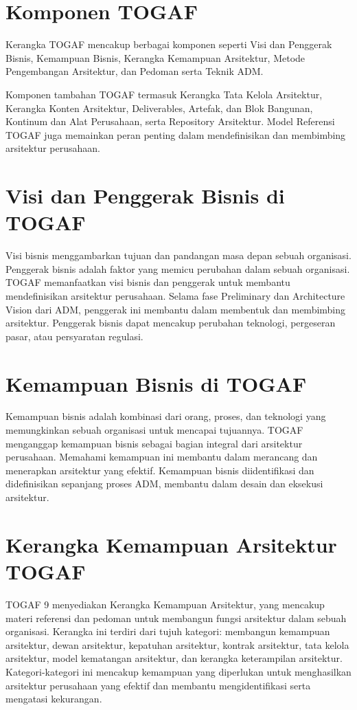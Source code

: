 \section{Komponen TOGAF}
Kerangka TOGAF mencakup berbagai komponen seperti Visi dan Penggerak Bisnis, Kemampuan Bisnis, Kerangka Kemampuan Arsitektur, Metode Pengembangan Arsitektur, dan Pedoman serta Teknik ADM.

Komponen tambahan TOGAF termasuk Kerangka Tata Kelola Arsitektur, Kerangka Konten Arsitektur, Deliverables, Artefak, dan Blok Bangunan, Kontinum dan Alat Perusahaan, serta Repository Arsitektur. Model Referensi TOGAF juga memainkan peran penting dalam mendefinisikan dan membimbing arsitektur perusahaan.

\section{Visi dan Penggerak Bisnis di TOGAF}
Visi bisnis menggambarkan tujuan dan pandangan masa depan sebuah organisasi. Penggerak bisnis adalah faktor yang memicu perubahan dalam sebuah organisasi. TOGAF memanfaatkan visi bisnis dan penggerak untuk membantu mendefinisikan arsitektur perusahaan. Selama fase Preliminary dan Architecture Vision dari ADM, penggerak ini membantu dalam membentuk dan membimbing arsitektur. Penggerak bisnis dapat mencakup perubahan teknologi, pergeseran pasar, atau persyaratan regulasi.

\section{Kemampuan Bisnis di TOGAF}
Kemampuan bisnis adalah kombinasi dari orang, proses, dan teknologi yang memungkinkan sebuah organisasi untuk mencapai tujuannya. TOGAF menganggap kemampuan bisnis sebagai bagian integral dari arsitektur perusahaan. Memahami kemampuan ini membantu dalam merancang dan menerapkan arsitektur yang efektif. Kemampuan bisnis diidentifikasi dan didefinisikan sepanjang proses ADM, membantu dalam desain dan eksekusi arsitektur.

\section{Kerangka Kemampuan Arsitektur TOGAF}
TOGAF 9 menyediakan Kerangka Kemampuan Arsitektur, yang mencakup materi referensi dan pedoman untuk membangun fungsi arsitektur dalam sebuah organisasi. Kerangka ini terdiri dari tujuh kategori: membangun kemampuan arsitektur, dewan arsitektur, kepatuhan arsitektur, kontrak arsitektur, tata kelola arsitektur, model kematangan arsitektur, dan kerangka keterampilan arsitektur. Kategori-kategori ini mencakup kemampuan yang diperlukan untuk menghasilkan arsitektur perusahaan yang efektif dan membantu mengidentifikasi serta mengatasi kekurangan.

